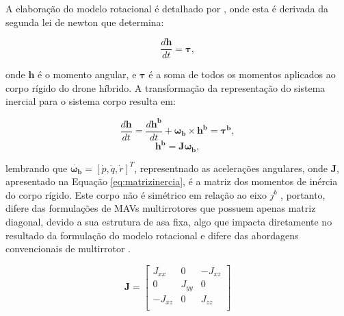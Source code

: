 A elaboração do modelo rotacional é detalhado por \textcite{Beard2012}, onde esta é derivada da segunda lei de newton que determina:

\begin{equation}
  \frac{d \mathbf{h}}{dt} = \boldsymbol{\tau},
  \label{eq:second-law-rotation}
\end{equation}

onde $\mathbf{h}$ é o momento angular, e $\boldsymbol{\tau}$ é a soma de todos os momentos aplicados ao corpo rígido do drone híbrido. A transformação da representação do sistema inercial para o sistema corpo resulta em:

\begin{equation}
  \frac{d \mathbf{h}}{dt} = \frac{d \mathbf{h^b}}{dt} + \boldsymbol{\omega_b} \times \mathbf{h^b}= \boldsymbol{\tau^b},
  \label{eq:second-law-rotation1}
\end{equation}
\begin{equation}
  \mathbf{h^b}=\mathbf{J} \boldsymbol{\omega_b},
  \label{eq:second-law-rotation2}
\end{equation}

lembrando que $\boldsymbol{\dot{\omega_b}} = [\dot{p},\dot{q},\dot{r}]^T$, representnado as acelerações angulares, onde $\mathbf{J}$, apresentado na Equação \eqref{eq:matrizinercia}, é a matriz dos momentos de inércia do corpo rígido. Este corpo não é simétrico em relação ao eixo $j^b$ \cite{Beard2012, Graesdal2021}, portanto, difere das formulações de MAVs multirrotores que possuem apenas matriz diagonal, devido a sua estrutura de asa fixa, algo que impacta diretamente no resultado da formulação do modelo rotacional e difere das abordagens convencionais de multirrotor \cite{Bouabdallah2007,Carino2015}.

\begin{equation}
  \mathbf{J}
  =
  \begin{bmatrix}
      J_{xx} & 0 & -J_{xz} \\
      0 & J_{yy} & 0 \\
      -J_{xz} & 0 & J_{zz} \\
  \end{bmatrix}
  \label{eq:matrizinercia}
\end{equation}

